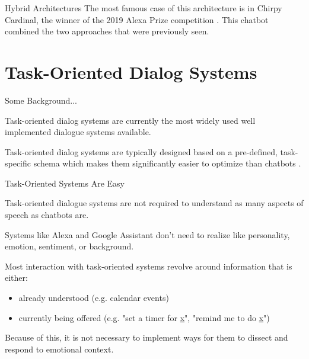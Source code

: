 \documentclass[10pt]{beamer}
\begin{document}
\begin{frame}{Hybrid Architectures}
The most famous case of this architecture is in Chirpy Cardinal, the winner of the 2019 Alexa Prize competition \cite{chirpy}.  This chatbot combined the two approaches that were previously seen.

\end{frame}





\section{Task-Oriented Dialog Systems}

 

\begin{frame}{Some Background...}

Task-oriented dialog systems are currently the most widely used well implemented dialogue systems available.

 

Task-oriented dialog systems are typically designed based on a pre-defined, task-specific schema which makes them significantly easier to optimize than chatbots \cite{10.1145/3383123}.

\end{frame}

 

\begin{frame}{Task-Oriented Systems Are Easy}

Task-oriented dialogue systems are not required to understand as many aspects of speech as chatbots are.

 

Systems like Alexa and Google Assistant don't need to realize like personality, emotion, sentiment, or background.

 

Most interaction with task-oriented systems revolve around information that is either:

    \begin{itemize}

        \item already understood (e.g. calendar events)

        \item currently being offered (e.g. "set a timer for \underline{x}", "remind me to do \underline{x}")

    \end{itemize}

Because of this, it is not necessary to implement ways for them to dissect and respond to emotional context.

\end{frame}
\end{document}
